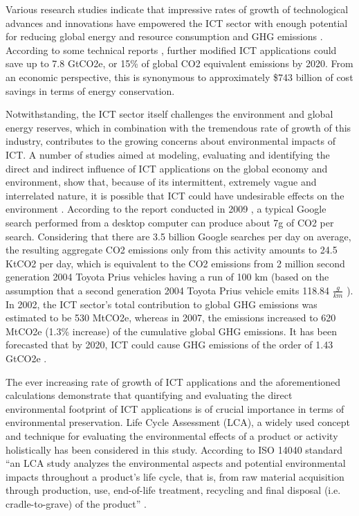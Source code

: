 \documentclass[conference]{IEEEtran}
\begin{document}
Various research studies indicate that impressive rates of growth of technological advances and innovations have empowered the ICT sector with enough potential for reducing global energy and resource consumption and GHG emissions  \cite{10046363,924525, 6360455}. According to some technical reports \cite{3758490, 7282419}, further modified ICT applications could save up to 7.8 GtCO2e, or 15\% of global CO2 equivalent emissions by 2020. From an economic perspective, this is synonymous to approximately \$743 billion of cost savings in terms of energy conservation.

Notwithstanding, the ICT sector itself challenges the environment and global energy reserves, which in combination with the tremendous rate of growth of this industry, contributes to the growing concerns about environmental impacts of ICT. A number of studies aimed at modeling, evaluating and identifying the direct and indirect influence of ICT applications on the global economy and environment, show that, because of its intermittent, extremely vague and interrelated nature, it is possible that ICT could have undesirable effects on the environment  \cite{Hilty20061618, 6083606, Bull201410}. According to the report conducted in 2009 \cite{7282419}, a typical Google search performed from a desktop computer can produce about 7g of CO2 per search. Considering that there are 3.5 billion Google searches per day on average, the resulting aggregate CO2 emissions only from this activity amounts to 24.5 KtCO2 per day, which is equivalent to the CO2 emissions from 2 million second generation 2004 Toyota Prius vehicles having a run of 100 km (based on the assumption that a second generation 2004 Toyota Prius vehicle emits 118.84 $\frac{g}{km}$ \cite{6728838}). In 2002, the ICT sector's total contribution to global GHG emissions was estimated to be 530 MtCO2e, whereas in 2007, the emissions increased to 620 MtCO2e (1.3\% increase) of the cumulative global GHG emissions. It has been forecasted that by 2020, ICT could cause GHG emissions of the order of 1.43 GtCO2e  \cite{malmodin2013future, 3758490}.

The ever increasing rate of growth of ICT applications and the aforementioned calculations demonstrate that quantifying and evaluating the direct environmental footprint of ICT applications is of crucial importance in terms of environmental preservation. Life Cycle Assessment (LCA), a widely used concept and technique for evaluating the environmental effects of a product or activity holistically has been considered in this study. According to ISO 14040 standard ``an LCA study analyzes the environmental aspects and potential environmental impacts throughout a product's life cycle, that is, from raw material acquisition through production, use, end-of-life treatment, recycling and final disposal (i.e. cradle-to-grave) of the product'' \cite{ISO140402006}.
\end{document}
